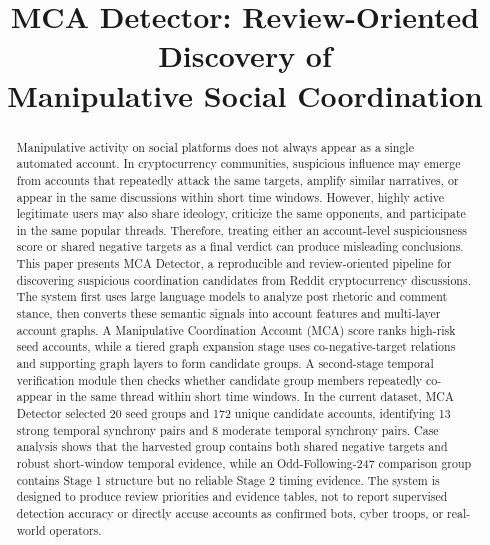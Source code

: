 \documentclass[conference]{IEEEtran}
\begin{document}
\title{MCA Detector: Review-Oriented Discovery of\\
Manipulative Social Coordination}

\author{
}

\maketitle

\begin{abstract}
Manipulative activity on social platforms does not always appear as a
single automated account. In cryptocurrency communities, suspicious influence
may emerge from accounts that repeatedly attack the same targets, amplify
similar narratives, or appear in the same discussions within short time
windows. However, highly active legitimate users may also share ideology,
criticize the same opponents, and participate in the same popular threads.
Therefore, treating either an account-level suspiciousness score or shared
negative targets as a final verdict can produce misleading conclusions. This
paper presents MCA Detector, a reproducible and review-oriented pipeline for
discovering suspicious coordination candidates from Reddit cryptocurrency
discussions. The system first uses large language models to analyze post
rhetoric and comment stance, then converts these semantic signals into
account features and multi-layer account graphs. A Manipulative Coordination
Account (MCA) score ranks high-risk seed accounts, while a tiered graph
expansion stage uses co-negative-target relations and supporting graph layers
to form candidate groups. A second-stage temporal verification module then
checks whether candidate group members repeatedly co-appear in the same
thread within short time windows. In the current dataset, MCA Detector
selected 20 seed groups and 172 unique candidate accounts, identifying 13
strong temporal synchrony pairs and 8 moderate temporal synchrony pairs. Case
analysis shows that the harvested group contains both shared negative targets
and robust short-window temporal evidence, while an Odd-Following-247
comparison group contains Stage 1 structure but no reliable Stage 2 timing
evidence. The system is designed to produce review priorities and evidence
tables, not to report supervised detection accuracy or directly accuse
accounts as confirmed bots, cyber troops, or real-world operators.
\end{abstract}
\end{document}
